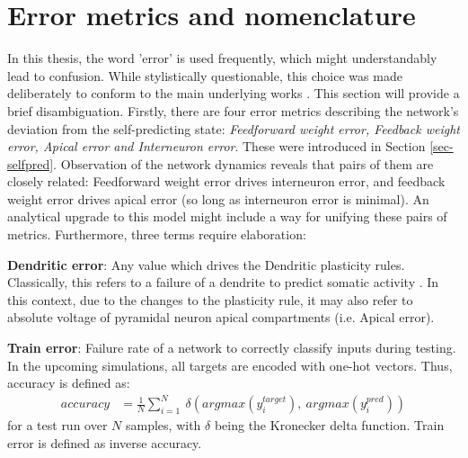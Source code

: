 \section{Error metrics and nomenclature}

In this thesis, the word 'error' is used frequently, which might understandably lead to confusion. While stylistically
questionable, this choice was made deliberately to conform to the main underlying works
\citep{urbanczik2014learning,sacramento2018dendritic,whittington2019theories,Haider2021}. This section will provide a
brief disambiguation. Firstly, there are four error metrics describing the network's deviation from the self-predicting
state: \textit{Feedforward weight error, Feedback weight error, Apical error and Interneuron error}. These were
introduced in Section \ref{sec-selfpred}. Observation of the network dynamics reveals that pairs of them are closely
related: Feedforward weight error drives interneuron error, and feedback weight error drives apical error (so long as
interneuron error is minimal). An analytical upgrade to this model might include a way for unifying these pairs of
metrics. Furthermore, three terms require elaboration:\newline

\textbf{Dendritic error}: Any value which drives the Dendritic plasticity rules. Classically, this refers to a failure
of a dendrite to predict somatic activity \citep{urbanczik2014learning}. In this context, due to the changes to the
plasticity rule, it may also refer to absolute voltage of pyramidal neuron apical compartments (i.e. Apical error). \newline

\textbf{Train error}: Failure rate of a network to correctly classify inputs during testing. In the upcoming
simulations, all targets are encoded with one-hot vectors. Thus, accuracy is defined as:
\begin{align*}
    accuracy &= \frac{1}{N} \sum_{i=1}^N \  \delta \left(argmax(y^{target}_i),\ argmax(y^{pred}_i) \right)
\end{align*}
for a test run over $N$ samples, with $\delta$ being the Kronecker delta function. Train error is defined as inverse
accuracy.\newline

